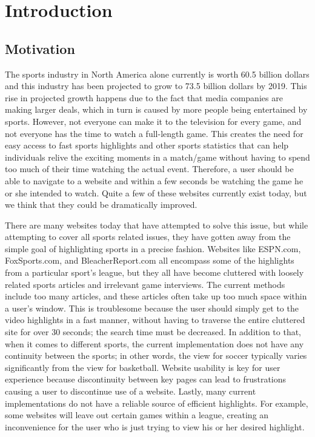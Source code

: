 \chapter{Introduction}

\section{Motivation}
\par The sports industry in North America alone currently is worth 60.5 billion dollars and this industry has been projected to grow to 73.5 billion dollars by 2019. This rise in projected growth happens due to the fact that media companies are making larger deals, which in turn is caused by more people being entertained by sports. However, not everyone can make it to the television for every game, and not everyone has the time to watch a full-length game. This creates the need for easy access to fast sports highlights and other sports statistics that can help individuals relive the exciting moments in a match/game without having to spend too much of their time watching the actual event. Therefore, a user should be able to navigate to a website and within a few seconds be watching the game he or she intended to watch. Quite a few of these websites currently exist today, but we think that they could be dramatically improved.\par
There are many websites today that have attempted to solve this issue, but while attempting to cover all sports related issues, they have gotten away from the simple goal of highlighting sports in a precise fashion. Websites like ESPN.com, FoxSports.com, and BleacherReport.com all encompass some of the highlights from a particular sport’s league, but they all have become cluttered with loosely related sports articles and irrelevant game interviews. The current methods include too many articles, and these articles often take up too much space within a user’s window. This is troublesome because the user should simply get to the video highlights in a fast manner, without having to traverse the entire cluttered site for over 30 seconds; the search time must be decreased. In addition to that, when it comes to different sports, the current implementation does not have any continuity between the sports; in other words, the view for soccer typically varies significantly from the view for basketball. Website usability is key for user experience because discontinuity between key pages can lead to frustrations causing a user to discontinue use of a website. Lastly, many current implementations do not have a reliable source of efficient highlights. For example, some websites will leave out certain games within a league, creating an inconvenience for the user who is just trying to view his or her desired highlight.


